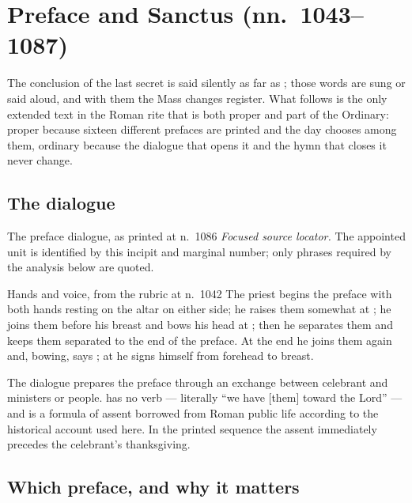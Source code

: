 \section{Preface and Sanctus (nn.~1043--1087)}

The conclusion of the last secret is said silently as far as ; those words are sung or said aloud, and with them
the Mass changes register. What follows is the only extended text in the Roman
rite that is both proper and part of the Ordinary: proper because sixteen
different prefaces are printed and the day chooses among them, ordinary because
the dialogue that opens it and the hymn that closes it never change.

\subsection*{The dialogue}

\begin{appointed}{The preface dialogue, as printed at n.~1086}
\textit{Focused source locator.} The appointed unit is identified by this incipit and marginal number; only phrases required by the analysis below are quoted.
\end{appointed}

\begin{rubricnote}{Hands and voice, from the rubric at n.~1042}
The priest begins the preface with both hands resting on the altar on either
side; he raises them somewhat at ; he joins them before
his breast and bows his head at ;
then he separates them and keeps them separated to the end of the preface. At
the end he joins them again and, bowing, says ; at
 he signs himself from forehead to breast.
\end{rubricnote}

The dialogue prepares the preface through an exchange between celebrant and
ministers or people.  has no verb --- literally ``we have [them] toward the Lord'' --- and
 is a formula of assent borrowed from Roman
public life according to the historical account used here. In the printed
sequence the assent immediately precedes the celebrant's thanksgiving.

\subsection*{Which preface, and why it matters}

